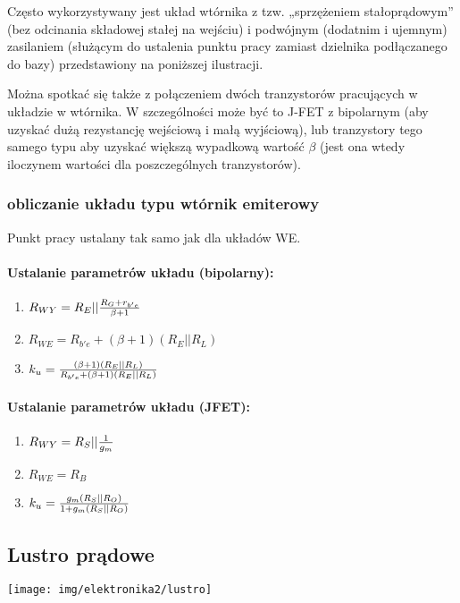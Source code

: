 \documentclass{pdfBooklets}
\begin{document}
Często wykorzystywany jest układ wtórnika z tzw. „sprzężeniem stałoprądowym” (bez odcinania składowej stałej na wejściu) i podwójnym (dodatnim i ujemnym) zasilaniem (służącym do ustalenia punktu pracy zamiast dzielnika podłączanego do bazy) przedstawiony na poniższej ilustracji.

Można spotkać się także z połączeniem dwóch tranzystorów pracujących w układzie w wtórnika.
W szczególności może być to J-FET z bipolarnym (aby uzyskać dużą rezystancję wejściową i małą wyjściową), lub tranzystory tego samego typu aby uzyskać większą wypadkową wartość $\beta$ (jest ona wtedy iloczynem wartości dla poszczególnych tranzystorów).

\subsubsection{obliczanie układu typu wtórnik emiterowy}
Punkt pracy ustalany tak samo jak dla układów WE.

\paragraph{Ustalanie parametrów układu (bipolarny):}
\begin{enumerate}
	\item $R_{WY} = R_E || {R_G + r_{b'e} \over \beta +1}$
	\item $R_{WE} = R_{b'e} + (\beta + 1) (R_E || R_L)$
	\item $k_u = {(\beta + 1) (R_E || R_L) \over R_{b'e} + (\beta + 1) (R_E || R_L)}$
\end{enumerate}

\paragraph{Ustalanie parametrów układu (JFET):}
\begin{enumerate}
	\item $R_{WY} = R_S || {1 \over g_m}$
	\item $R_{WE} = R_{B}$
	\item $k_u = {g_m (R_S || R_O) \over 1 + g_m (R_S || R_O)}$
\end{enumerate}


\subsection{Lustro prądowe}
\begin{center}\texttt{[image: img/elektronika2/lustro]}\end{center}
\end{document}
